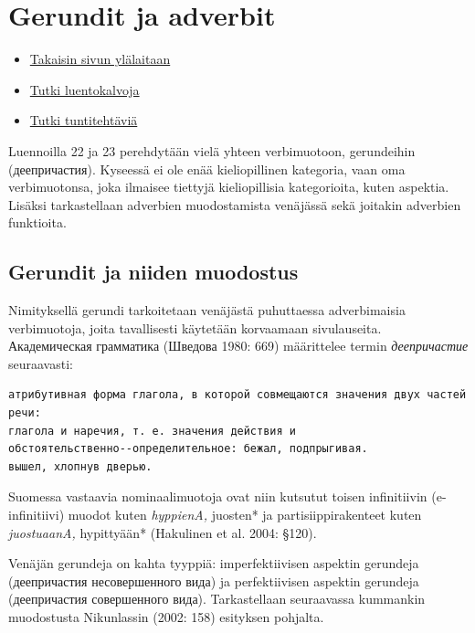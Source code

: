 \documentclass[]{scrreprt}
\providecommand{\tightlist}{%
  \setlength{\itemsep}{0pt}\setlength{\parskip}{0pt}}
\begin{document}
\chapter{Gerundit ja
adverbit}\label{luento-2223-gerundit-ja-adverbit}

\begin{itemize}
\tightlist
\item
  \href{https://mustikka.uta.fi/~juho_harme/morfologia/\#tästä-kurssista}{Takaisin
  sivun ylälaitaan}
\item
  \href{http://mustikka.uta.fi/~juho_harme/morfologia/presentations/luento22.html}{Tutki
  luentokalvoja}
\item
  \href{http://mustikka.uta.fi/~juho_harme/morfologia/tehtavat/luento22.pdf}{Tutki
  tuntitehtäviä}
\end{itemize}

Luennoilla 22 ja 23 perehdytään vielä yhteen verbimuotoon, gerundeihin
(деепричастия). Kyseessä ei ole enää kieliopillinen kategoria, vaan oma
verbimuotonsa, joka ilmaisee tiettyjä kieliopillisia kategorioita, kuten
aspektia. Lisäksi tarkastellaan adverbien muodostamista venäjässä sekä
joitakin adverbien funktioita.

\section{Gerundit ja niiden
muodostus}\label{gerundit-ja-niiden-muodostus}

Nimityksellä gerundi tarkoitetaan venäjästä puhuttaessa adverbimaisia
verbimuotoja, joita tavallisesti käytetään korvaamaan sivulauseita.
Академическая грамматика (Шведова 1980: 669) määrittelee termin
\emph{деепричастие} seuraavasti:

\begin{verbatim}
атрибутивная форма глагола, в которой совмещаются значения двух частей речи:
глагола и наречия, т. е. значения действия и
обстоятельственно--определительное: бежал, подпрыгивая.
вышел, хлопнув дверью.
\end{verbatim}

Suomessa vastaavia nominaalimuotoja ovat niin kutsutut toisen
infinitiivin (e-infinitiivi) muodot kuten \emph{hyppienA, }juosten* ja
partisiippirakenteet kuten \emph{juostuaanA, }hypittyään* (Hakulinen et
al. 2004: §120).

Venäjän gerundeja on kahta tyyppiä: imperfektiivisen aspektin gerundeja
(деепричастия несовершенного вида) ja perfektiivisen aspektin gerundeja
(деепричастия совершенного вида). Tarkastellaan seuraavassa kummankin
muodostusta Nikunlassin (2002: 158) esityksen pohjalta.
\end{document}
